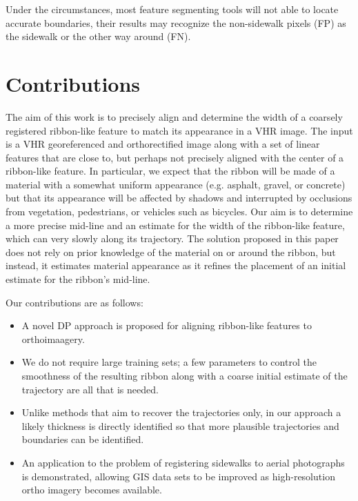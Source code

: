 Under the circumstances, most feature segmenting tools will not able to locate accurate boundaries, their results may recognize the non-sidewalk pixels (FP) as the sidewalk or the other way around (FN). 

\section{Contributions}

The aim of this work is to precisely align and determine the width of a coarsely registered ribbon-like feature to match its appearance in a \ac{VHR} image. The input is a \ac{VHR} georeferenced and orthorectified image along with a set of linear features that are close to, but perhaps not precisely aligned with the center of a ribbon-like feature. In particular, we expect that the ribbon will be made of a material with a somewhat uniform appearance (e.g. asphalt, gravel, or concrete) but that its appearance will be affected by shadows and interrupted by occlusions from vegetation, pedestrians, or vehicles such as bicycles. Our aim is to determine a more precise mid-line and an estimate for the width of the ribbon-like feature, which can very slowly along its trajectory. The solution proposed in this paper does not rely on prior knowledge of the material on or around the ribbon, but instead, it estimates material appearance as it refines the placement of an initial estimate for the ribbon's mid-line.
	
	Our contributions are as follows:
	\begin{itemize}
		\item A novel \ac{DP} approach is proposed for aligning ribbon-like features to orthoimaagery.
		\item We do not require large training sets; a few parameters to control the smoothness of the resulting ribbon along with a coarse initial estimate of the trajectory are all that is needed.
		\item Unlike methods that aim to recover the trajectories only, in our approach a likely thickness is directly identified so that more plausible trajectories and boundaries can be identified.
		\item An application to the problem of registering sidewalks to aerial photographs is demonstrated, allowing \ac{GIS} data sets to be improved as high-resolution ortho imagery becomes available. 
	\end{itemize}